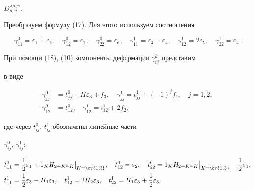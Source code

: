 $D^{\lambda\mu{}qs}_{p,u}$. 


 


Преобразуем формулу (17). Для этого используем соотношения 


\begin{equation} 


\gamma^0_{11}=\varepsilon_1+\varepsilon_6,\quad 


\gamma^0_{12}=\varepsilon_2,\quad 


\gamma^0_{22}=\varepsilon_6,\quad 


\gamma^1_{11}=\varepsilon_3-\varepsilon_4,\quad 


\gamma^1_{12}=2\varepsilon_5,\quad 


\gamma^1_{22}=\varepsilon_4. 


\end{equation} 


При помощи (18), (10) компоненты деформации $\gamma^k_{ij}$ представим 


в виде 


\begin{equation} 


\begin{split} 


\gamma^0_{jj}&=t^0_{jj}+H\varepsilon_3+f_3,\quad 


\gamma^1_{jj}=t^1_{jj}+(-1)^j f_1,\quad j=1,2, \\ 


\gamma^0_{12}&=t^0_{12},\quad \gamma^1_{12}=t^1_{12}+2f_2, 


\end{split} 


\end{equation} 


где через $t^0_{ij}$, $t^1_{ij}$ обозначены линейные части 


$\gamma^0_{ij}$, $\gamma^1_{ij}$: 


\begin{equation} 


\begin{split} 


t^0_{11}&=\frac{1}{2}\varepsilon_1+1_K H_{2+K}\varepsilon_K 


\big|_{K=\ov{1,3}},\quad t^0_{12}=\varepsilon_2,\quad 


t^0_{22}=1_K H_{2+K}\varepsilon_K\big|_{K=\ov{1,3}}- 


\frac{1}{2}\varepsilon_1, \\ 


t^1_{11}&=\frac{1}{2}\varepsilon_3-H_1\varepsilon_3,\quad 


t^1_{12}=2H_2\varepsilon_3,\quad 


t^1_{22}=H_1\varepsilon_3+\frac{1}{2}\varepsilon_3. 


\end{split} 


\end{equation} 


